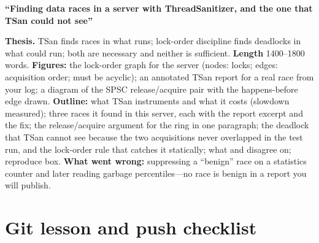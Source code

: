 \begin{blogbox}
 \textbf{``Finding data races in a server with ThreadSanitizer, and the one that TSan could not see''}

\textbf{Thesis.} TSan finds races in what runs; lock-order discipline finds deadlocks in what could run; both are necessary and neither is sufficient. \textbf{Length} 1400--1800 words. \textbf{Figures:} the lock-order graph for the server (nodes: locks; edges: acquisition order; must be acyclic); an annotated TSan report for a real race from your log; a diagram of the SPSC release/acquire pair with the happens-before edge drawn. \textbf{Outline:} what TSan instruments and what it costs (slowdown measured); three races it found in this server, each with the report excerpt and the fix; the release/acquire argument for the ring in one paragraph; the deadlock that TSan cannot see because the two acquisitions never overlapped in the test run, and the lock-order rule that catches it statically; what  and  disagree on; reproduce box. \textbf{What went wrong:} suppressing a ``benign'' race on a statistics counter and later reading garbage percentiles---no race is benign in a report you will publish.
\end{blogbox}

\section{Git lesson and push checklist}

